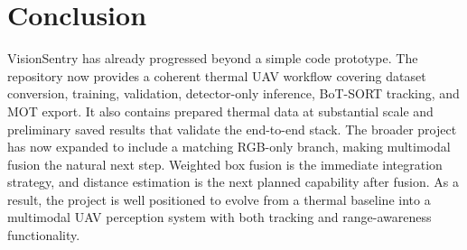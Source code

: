 \documentclass[10pt,conference]{IEEEtran}
\begin{document}
\section{Conclusion}
VisionSentry has already progressed beyond a simple code prototype. The repository now provides a coherent thermal UAV workflow covering dataset conversion, training, validation, detector-only inference, BoT-SORT tracking, and MOT export. It also contains prepared thermal data at substantial scale and preliminary saved results that validate the end-to-end stack. The broader project has now expanded to include a matching RGB-only branch, making multimodal fusion the natural next step. Weighted box fusion is the immediate integration strategy, and distance estimation is the next planned capability after fusion. As a result, the project is well positioned to evolve from a thermal baseline into a multimodal UAV perception system with both tracking and range-awareness functionality.
\end{document}
